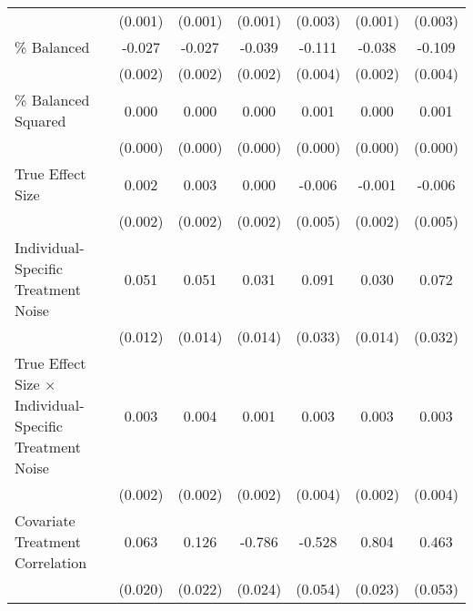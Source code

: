 \begin{table}[htbp]
\begin{tabular}{l*{6}{c}}
                    &     (0.001)         &     (0.001)         &     (0.001)         &     (0.003)         &     (0.001)         &     (0.003)         \\
\% Balanced         &      -0.027\sym{***}&      -0.027\sym{***}&      -0.039\sym{***}&      -0.111\sym{***}&      -0.038\sym{***}&      -0.109\sym{***}\\
                    &     (0.002)         &     (0.002)         &     (0.002)         &     (0.004)         &     (0.002)         &     (0.004)         \\
\% Balanced Squared &       0.000\sym{***}&       0.000\sym{***}&       0.000\sym{***}&       0.001\sym{***}&       0.000\sym{***}&       0.001\sym{***}\\
                    &     (0.000)         &     (0.000)         &     (0.000)         &     (0.000)         &     (0.000)         &     (0.000)         \\
True Effect Size    &       0.002         &       0.003         &       0.000         &      -0.006         &      -0.001         &      -0.006         \\
                    &     (0.002)         &     (0.002)         &     (0.002)         &     (0.005)         &     (0.002)         &     (0.005)         \\
Individual-Specific Treatment Noise&       0.051\sym{***}&       0.051\sym{***}&       0.031\sym{*}  &       0.091\sym{**} &       0.030\sym{*}  &       0.072\sym{*}  \\
                    &     (0.012)         &     (0.014)         &     (0.014)         &     (0.033)         &     (0.014)         &     (0.032)         \\
True Effect Size $\times$ Individual-Specific Treatment Noise&       0.003\sym{*}  &       0.004\sym{*}  &       0.001         &       0.003         &       0.003         &       0.003         \\
                    &     (0.002)         &     (0.002)         &     (0.002)         &     (0.004)         &     (0.002)         &     (0.004)         \\
Covariate Treatment Correlation&       0.063\sym{**} &       0.126\sym{***}&      -0.786\sym{***}&      -0.528\sym{***}&       0.804\sym{***}&       0.463\sym{***}\\
                    &     (0.020)         &     (0.022)         &     (0.024)         &     (0.054)         &     (0.023)         &     (0.053)         \\

\end{tabular}
\end{table}
